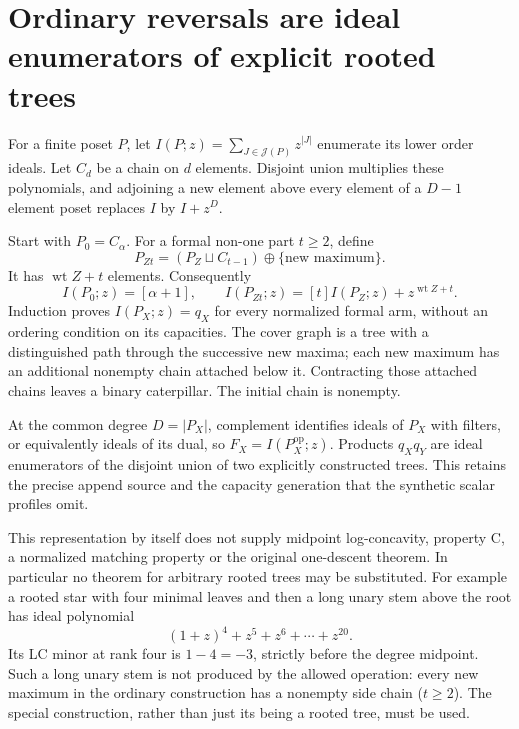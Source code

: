 \section{Ordinary reversals are ideal enumerators of explicit rooted trees}
For a finite poset $P$, let
$I(P;z)=\sum_{J\in\mathcal J(P)}z^{|J|}$ enumerate its lower order ideals.
Let $C_d$ be a chain on $d$ elements. Disjoint union multiplies
these polynomials, and adjoining a new element above every element
of a $D-1$ element poset replaces $I$ by $I+z^D$.

Start with $P_0=C_\alpha$. For a formal non-one part $t\ge2$,
define
\[
       P_{Zt}=(P_Z\sqcup C_{t-1})\oplus\{\text{new maximum}\}.
\]
It has $\operatorname{wt}Z+t$ elements. Consequently
\[
 I(P_0;z)=[\alpha+1],\qquad
 I(P_{Zt};z)=[t]I(P_Z;z)+z^{\operatorname{wt}Z+t}.
\]
Induction proves $I(P_X;z)=q_X$ for every normalized formal arm,
without an ordering condition on its capacities.
The cover graph is a tree with a distinguished path through the
successive new maxima; each new maximum has an additional nonempty
chain attached below it. Contracting those attached chains leaves
a binary caterpillar. The initial chain is nonempty.

At the common degree $D=|P_X|$, complement identifies ideals of
$P_X$ with filters, or equivalently ideals of its dual, so
$F_X=I(P_X^{\mathrm{op}};z)$. Products $q_Xq_Y$ are ideal
enumerators of the disjoint union of two explicitly constructed
trees. This retains the precise append source and the capacity
generation that the synthetic scalar profiles omit.

This representation by itself does not supply midpoint log-concavity,
property C, a normalized matching property or the original
one-descent theorem. In particular no theorem for arbitrary rooted
trees may be substituted. For example a rooted star with four
minimal leaves and then a long unary stem above the root has
ideal polynomial
\[
                 (1+z)^4+z^5+z^6+\cdots+z^{20}.
\]
Its LC minor at rank four is $1-4=-3$, strictly before the
degree midpoint. Such a long unary stem is not produced by the
allowed operation: every new maximum in the ordinary construction
has a nonempty side chain ($t\ge2$). The special construction,
rather than just its being a rooted tree, must be used.


